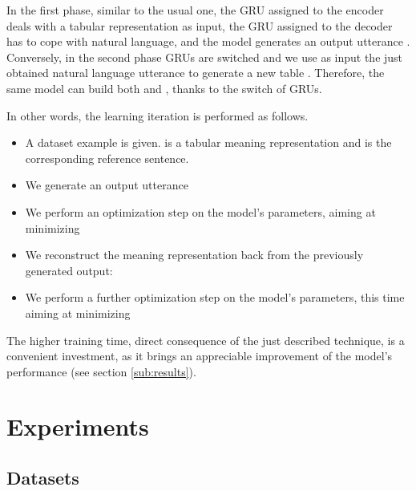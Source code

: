 \documentclass[runningheads, envcountsame, a4paper]{llncs}
\begin{document}
In the first phase, similar to the usual one, the GRU assigned to the encoder deals with a tabular representation  as input, the GRU assigned to the decoder has to cope with natural language, and the model generates an output utterance . Conversely, in the second phase GRUs are switched and we use as input the just obtained natural language utterance  to generate a new table . Therefore, the same model can build both  and , thanks to the switch of GRUs.



In other words, the learning iteration is performed as follows.
\begin{itemize}
    \item A dataset example  is given.  is a tabular meaning representation and  is the corresponding reference sentence.
    \item We generate an output utterance  
    \item We perform an optimization step on the model's parameters, aiming at minimizing  
    \item We reconstruct the meaning representation  back from the previously generated output: 
    \item We perform a further optimization step on the model's parameters, this time aiming at minimizing  
\end{itemize}

The higher training time, direct consequence of the just described technique, is a convenient investment, as it brings an appreciable improvement of the model's performance (see section \ref{sub:results}).



\section{Experiments}
\label{sec:experiments}

\subsection{Datasets}
\label{sec:Datasets}
\end{document}
